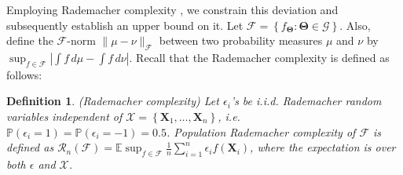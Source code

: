 \documentclass{article}
\newcommand{\E}{\mathbb{E}}
\newtheorem{lemma}{Lemma}[section]
\newtheorem{defn}{Definition}
\begin{document}
Employing Rademacher complexity \citep{DUDLEY1967290,FoML-mohri}, we constrain this deviation and subsequently establish an upper bound on it. Let $\mathcal{F}=\left\{f_{\bm\Theta}: \bm{\Theta} \in\mathscr{G}\right\}$. Also, define the $\mathcal{F}$-norm $\|\mu-\nu\|_{\mathcal{F}}$ between two probability measures $\mu$ and $\nu$ \citep{athreya2006measure} by $ \sup_{f \in \mathcal{F}}\left|\int f \,d\mu-\int f \,d\nu\right|$. Recall that the Rademacher complexity is defined as follows:

\begin{defn}
    (Rademacher complexity) Let $\epsilon_i$'s be i.i.d. Rademacher random variables independent of $\mathcal{X}=\left\{\boldsymbol{X}_1, \ldots, \boldsymbol{X}_n\right\}$, i.e. $\mathbb{P}\left(\epsilon_i=1\right)=\mathbb{P}\left(\epsilon_i=-1\right)=0.5$. Population Rademacher complexity of $\mathcal{F}$ is defined as $\mathcal{R}_n(\mathcal{F})=\E\sup _{f \in \mathcal{F}} \frac{1}{n} \sum_{i=1}^n \epsilon_i f\left(\boldsymbol{X}_i\right)$, where the expectation is over both $\epsilon$ and $\mathcal{X}$.
\end{defn}

\end{document}
